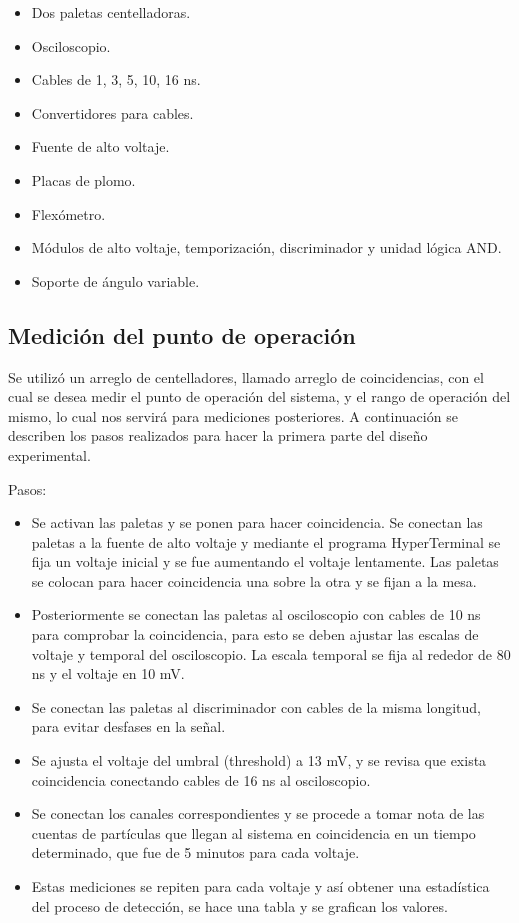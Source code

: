 \documentclass[a4paper,10pt]{article}
\numberwithin{equation}{section}
\begin{document}
\begin{itemize}
 \item Dos paletas centelladoras.
 \item Osciloscopio.
 \item Cables de 1, 3, 5, 10, 16 ns.
 \item Convertidores para cables.
 \item Fuente de alto voltaje.
 \item Placas de plomo.
 \item Flexómetro.
 \item Módulos de alto voltaje, temporización, discriminador y unidad lógica AND.
 \item Soporte de ángulo variable.
\end{itemize}


\subsection{Medición del punto de operación}
\label{ss:medicionoperacion}

Se utilizó un arreglo de centelladores, llamado arreglo de coincidencias, con el cual se desea medir el punto de operación del sistema, y el rango de operación del mismo, 
lo cual nos servirá para mediciones posteriores. A continuación se describen los 
pasos realizados para hacer la primera parte del diseño experimental.

\vspace{.3cm}

Pasos:

\begin{itemize}
 \item Se activan las paletas y se ponen para hacer coincidencia. Se conectan las paletas a la fuente de alto voltaje y 
 mediante el programa HyperTerminal se fija un voltaje inicial y se fue aumentando el voltaje lentamente. Las paletas 
 se colocan para hacer coincidencia una sobre la otra y se fijan a la mesa.
 \item Posteriormente se conectan las paletas al osciloscopio con cables de 10 ns  para comprobar la coincidencia, para esto se deben ajustar 
 las escalas de voltaje y temporal del osciloscopio. La escala temporal se fija al rededor de 80 ns y 
 el voltaje en 10 mV.
 \item Se conectan las paletas al discriminador con cables de la misma longitud, para evitar desfases en la señal.
 \item Se ajusta el voltaje del umbral (threshold) a 13 mV, y se revisa que exista coincidencia conectando cables de 
 16 ns al osciloscopio.
 \item Se conectan los canales correspondientes y se procede a tomar nota de las cuentas de partículas que llegan al sistema
 en coincidencia en un tiempo determinado, que fue de 5 minutos para cada voltaje.
 \item Estas mediciones se repiten para cada voltaje y así obtener una estadística del proceso de detección, se hace una tabla y 
 se grafican los valores.
\end{itemize}
\end{document}
